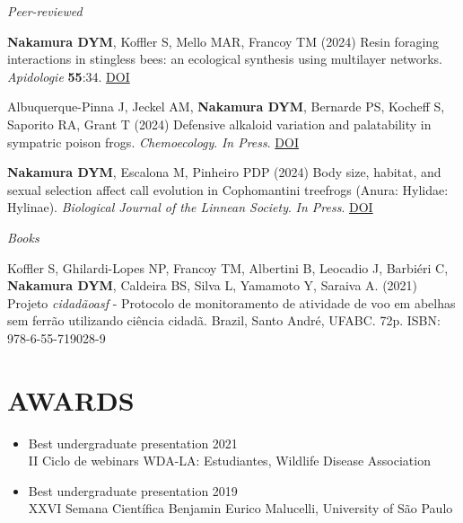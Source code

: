 \documentclass[margin, 10pt]{res} %
\begin{document}
\begin{resume}
{\sl Peer-reviewed}
\begin{etaremune}
\item \textbf{Nakamura DYM}, Koffler S, Mello MAR, Francoy TM (2024) Resin foraging interactions in stingless bees: an ecological synthesis using multilayer networks. \emph{Apidologie} \textbf{55}:34.  \href{https://doi.org/10.1007/s13592-024-01082-8}{DOI}
\item Albuquerque-Pinna J, Jeckel AM, \textbf{Nakamura DYM}, Bernarde PS, Kocheff S, Saporito RA, Grant T (2024) Defensive alkaloid variation and palatability in sympatric poison frogs. \emph{Chemoecology}. \emph{In Press}. \href{https://doi.org/10.1007/s00049-024-00402-9}{DOI} 
\item \textbf{Nakamura DYM}, Escalona M, Pinheiro PDP (2024) Body size, habitat, and sexual selection affect call evolution in Cophomantini treefrogs (Anura: Hylidae: Hylinae). \emph{Biological Journal of the Linnean Society}. \emph{In Press}. \href{https://doi.org/10.1093/biolinnean/blae036}{DOI}
\end{etaremune}

{\sl Books}
\begin{etaremune}
\item Koffler S, Ghilardi-Lopes NP, Francoy TM, Albertini B, Leocadio J, Barbiéri C, \textbf{Nakamura DYM}, Caldeira BS, Silva L, Yamamoto Y, Saraiva A. (2021) Projeto \emph{cidadãoasf} - Protocolo de monitoramento de atividade de voo em abelhas sem ferrão utilizando ciência cidadã. Brazil, Santo André, UFABC. 72p. ISBN: 978-6-55-719028-9
\end{etaremune}


\section{AWARDS}
\begin{itemize}
\item Best undergraduate presentation \hfill 2021 \\
II Ciclo de webinars WDA-LA: Estudiantes, Wildlife Disease Association 
\item Best undergraduate presentation \hfill 2019 \\
XXVI Semana Científica Benjamin Eurico Malucelli, University of São Paulo 
\end{itemize}



\end{resume}
\end{document}
